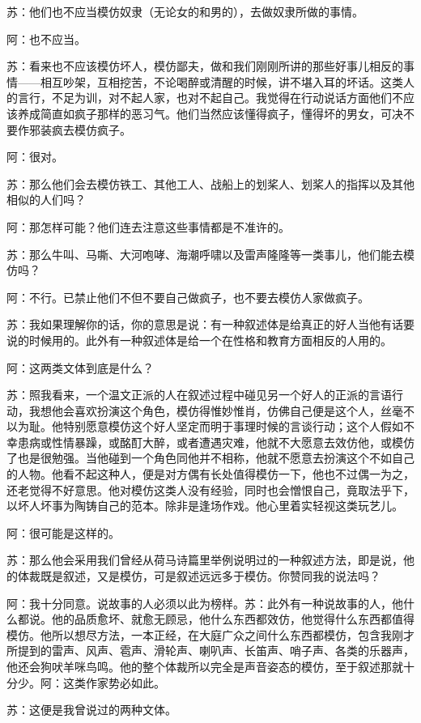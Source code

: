 \documentclass[11pt,oneside]{book}
\begin{document}
\begin{common-format}
苏：他们也不应当模仿奴隶（无论女的和男的），去做奴隶所做的事情。

阿：也不应当。

苏：看来也不应该模仿坏人，模仿鄙夫，做和我们刚刚所讲的那些好事儿相反的事情——相互吵架，互相挖苦，不论喝醉或清醒的时候，讲不堪入耳的坏话。这类人的言行，不足为训，对不起人家，也对不起自己。我觉得在行动说话方面他们不应该养成简直如疯子那样的恶习气。他们当然应该懂得疯子，懂得坏的男女，可决不要作邪装疯去模仿疯子。

阿：很对。

苏：那么他们会去模仿铁工、其他工人、战船上的划桨人、划桨人的指挥以及其他相似的人们吗？

阿：那怎样可能？他们连去注意这些事情都是不准许的。

苏：那么牛叫、马嘶、大河咆哮、海潮呼啸以及雷声隆隆等一类事儿，他们能去模仿吗？

阿：不行。已禁止他们不但不要自己做疯子，也不要去模仿人家做疯子。

苏：我如果理解你的话，你的意思是说：有一种叙述体是给真正的好人当他有话要说的时候用的。此外有一种叙述体是给一个在性格和教育方面相反的人用的。

阿：这两类文体到底是什么？

苏：照我看来，一个温文正派的人在叙述过程中碰见另一个好人的正派的言语行动，我想他会喜欢扮演这个角色，模仿得惟妙惟肖，仿佛自己便是这个人，丝毫不以为耻。他特别愿意模仿这个好人坚定而明于事理时候的言谈行动；这个人假如不幸患病或性情暴躁，或酩酊大醉，或者遭遇灾难，他就不大愿意去效仿他，或模仿了也是很勉强。当他碰到一个角色同他并不相称，他就不愿意去扮演这个不如自己的人物。他看不起这种人，便是对方偶有长处值得模仿一下，他也不过偶一为之，还老觉得不好意思。他对模仿这类人没有经验，同时也会憎恨自己，竟取法乎下，以坏人坏事为陶铸自己的范本。除非是逢场作戏。他心里着实轻视这类玩艺儿。

阿：很可能是这样的。

苏：那么他会采用我们曾经从荷马诗篇里举例说明过的一种叙述方法，即是说，他的体裁既是叙述，又是模仿，可是叙述远远多于模仿。你赞同我的说法吗？

阿：我十分同意。说故事的人必须以此为榜样。苏：此外有一种说故事的人，他什么都说。他的品质愈坏、就愈无顾忌，他什么东西都效仿，他觉得什么东西都值得模仿。他所以想尽方法，一本正经，在大庭广众之间什么东西都模仿，包含我刚才所提到的雷声、风声、雹声、滑轮声、喇叭声、长笛声、哨子声、各类的乐器声，他还会狗吠羊咪鸟鸣。他的整个体裁所以完全是声音姿态的模仿，至于叙述那就十分少。阿：这类作家势必如此。

苏：这便是我曾说过的两种文体。


\end{common-format}
\end{document}
